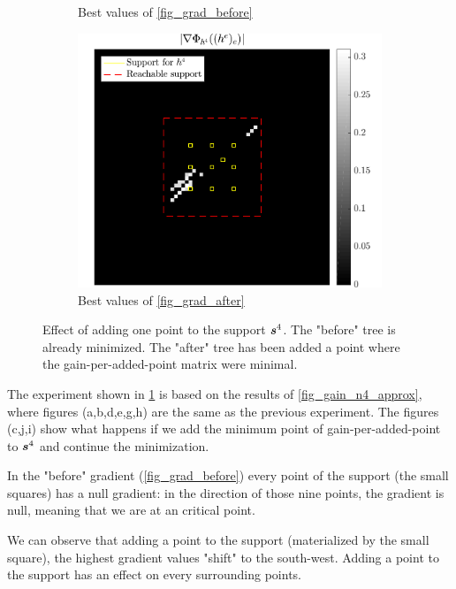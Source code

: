 \begin{figure}[!ht]
\begin{subfigure}[b]{0.32\linewidth}
\caption{Best values of \ref{fig_grad_before}}
\end{subfigure}
\begin{subfigure}[b]{0.32\linewidth}\centering
\includegraphics[width=\linewidth]{figures/before_after/xp_128x128_sc2_angl1_K3_S3_node4after_partgrad4_bestvalues.pdf}
\caption{Best values of \ref{fig_grad_after}}
\end{subfigure}
\caption{Effect of adding one point to the support $\bm{s}^4$. The "before" tree is already minimized. The "after" tree has been added a point where the gain-per-added-point matrix were minimal.} \label{fig_before_after_adding}
\end{figure}

The experiment shown in \cref{fig_before_after_adding} is based on the results of \cref{fig_gain_n4_approx}, where figures (a,b,d,e,g,h) are the same as the previous experiment. The figures (c,j,i) show what  happens if we add the minimum point of gain-per-added-point to $\bm{s}^4$ and continue the minimization.

In the "before" gradient (\cref{fig_grad_before}) every point of the support (the small squares) has a null gradient: in the direction of those nine points, the gradient is null, meaning that we are at an critical point.

We can observe that adding a point to the support (materialized by the  small square), the highest gradient values "shift" to the south-west. Adding a point to the support has an effect on every surrounding points.


